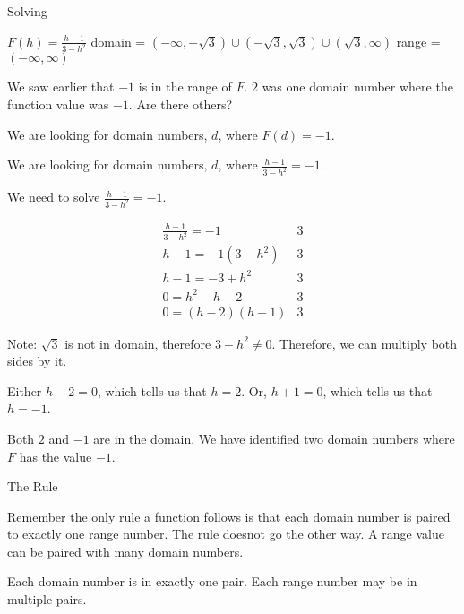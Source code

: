 \documentclass{ximera}
\begin{document}
\begin{example}   Solving

$F(h) = \frac{h-1}{3-h^2}$
domain = $(-\infty, -\sqrt{3}) \cup (-\sqrt{3}, \sqrt{3}) \cup (\sqrt{3}, \infty)$
range = $(-\infty, \infty)$


We saw earlier that $-1$ is in the range of $F$. $2$ was one domain number where the function value was $-1$. Are there others?


We are looking for domain numbers, $d$, where $F(d) = -1$.  

We are looking for domain numbers, $d$, where $\frac{h-1}{3-h^2} = -1$.  

We need to solve $\frac{h-1}{3-h^2} = -1$.



\[
\begin{array}{ll}
\frac{h-1}{3-h^2} = -1 &  3\\
h - 1 = -1 (3 - h^2)    &  3 \\
h - 1 = -3 + h^2    &      3\\
0 = h^2 - h - 2    &      3\\
0 =(h-2)(h+1)    &   3   
\end{array}
\]


Note:  $\sqrt{3}$ is not in domain, therefore $3 - h^2 \ne 0$. Therefore, we can multiply both sides by it.  

Either $h-2 = 0$, which tells us that $h = 2$. Or, $h+1 = 0$, which tells us that $h = -1$.

Both $2$ and $-1$ are in the domain.  We have identified two domain numbers where $F$ has the value $-1$.



\end{example}



\begin{remark}  The Rule

Remember the only rule a function follows is that each domain number is paired to exactly one range number.  The rule doesnot go the other way.  A range value can be paired with many domain numbers.

Each domain number is in exactly one pair.
Each range number may be in multiple pairs.


\end{remark}
\end{document}
